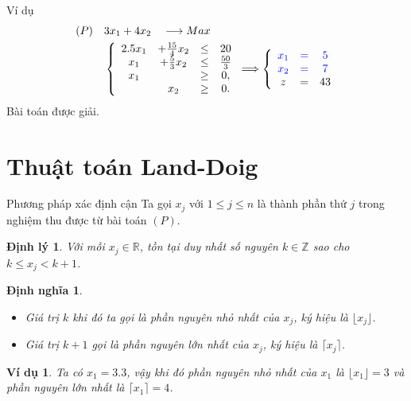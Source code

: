 \documentclass[10pt]{beamer}
\newtheorem{dn}{Định nghĩa}[section]
\newtheorem{dl}{Định lý}[section]
\newtheorem{vd}{Ví dụ}[section]
\begin{document}
\begin{frame}{Ví dụ}
    \begin{equation} \label{baitoannguyenhet}
    \begin{split}
        (P) \quad & 3x_1 + 4x_2 \quad \longrightarrow Max \\
        & \left\{\begin{array} {cccc}
        2.5x_1 &+ \frac{15}{4}x_2 &\leq& 20 \\
        x_1 &+ \frac{5}{3}x_2 &\leq& \frac{50}{3} \\
        x_1 &&\geq &0, \\
        &x_2 &\geq& 0. \\
        \end{array}\right.
        \Longrightarrow
        \left\{\begin{array}{ccc}
        \color{blue} x_1 &\color{blue} = &\color{blue} 5 \\
        \color{blue} x_2 &\color{blue} = & \color{blue} 7 \\
        z& =&43
    \end{array}\right.
    \end{split}
    \end{equation}
    \vspace{0.5cm}
    \center
    \Large
    Bài toán được giải.
\end{frame}

\section*{Thuật toán Land-Doig}

\begin{frame}{Phương pháp xác định cận}
Ta gọi $x_j$ với $1 \leq j \leq n$ là thành phần thứ $j$ trong nghiệm thu được từ bài toán $(P)$.
\begin{dl}\label{cmnguyen}
Với mỗi $x_j \in \mathbb{R}$, tồn tại duy nhất số nguyên $k \in \mathbb{Z}$ sao cho $k \leq x_j < k+1$.
\end{dl}

\begin{dn}
\begin{itemize}
\item Giá trị $k$ khi đó ta gọi là phần nguyên nhỏ nhất của $x_j$, ký hiệu là $\lfloor x_j \rfloor$.
\item Giá trị $k+1$ gọi là phần nguyên lớn nhất của $x_j$, ký hiệu là $\lceil x_j \rceil$.
\end{itemize}
\end{dn}

\begin{vd}
Ta có $x_1=3.3$, vậy khi đó phần nguyên nhỏ nhất của $x_1$ là $\lfloor x_1 \rfloor = 3$ và phần nguyên lớn nhất là $\lceil x_1 \rceil =4$.
\end{vd}
\end{frame}
\end{document}
